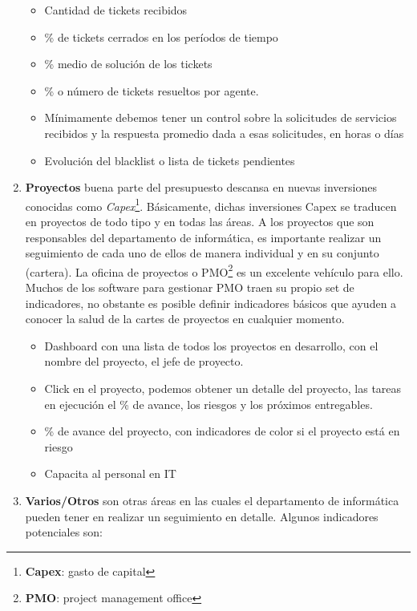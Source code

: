 \documentclass[12pt]{article}
\begin{document}
\begin{enumerate}
  \begin{itemize}
    \item Cantidad de tickets recibidos
    \item \% de tickets cerrados en los períodos de tiempo
    \item \% medio de solución de los tickets
    \item \% o número de tickets resueltos por agente.
    \item Mínimamente debemos tener un control sobre la solicitudes de servicios recibidos y la respuesta promedio dada a esas solicitudes, en horas o días
    \item Evolución del blacklist o lista de tickets pendientes
  \end{itemize}

  \item \textbf{Proyectos} buena parte del presupuesto descansa en nuevas inversiones conocidas como \textit{Capex}\footnote{\textbf{Capex}: gasto de capital}. Básicamente, dichas inversiones Capex se traducen en proyectos de todo tipo y en todas las áreas. A los proyectos que son responsables del departamento de informática, es importante realizar un seguimiento de cada uno de ellos de manera individual y en su conjunto (cartera). La oficina de proyectos o PMO\footnote{\textbf{PMO}: project management office} es un excelente vehículo para ello. Muchos de los software para gestionar PMO traen su propio set de indicadores, no obstante es posible definir indicadores básicos que ayuden a conocer la salud de la cartes de proyectos en cualquier momento.

  \begin{itemize}
    \item Dashboard con una lista de todos los proyectos en desarrollo, con el nombre del proyecto,
    el jefe de proyecto.
    \item Click en el proyecto, podemos obtener un detalle del proyecto, las tareas en ejecución el \% de avance, los riesgos y los próximos entregables.
    \item \% de avance del proyecto, con indicadores de color si el proyecto está en riesgo
    \item Capacita al personal en IT
  \end{itemize}

  \item \textbf{Varios/Otros} son otras áreas en las cuales el departamento de informática pueden tener en realizar un seguimiento en detalle. Algunos indicadores potenciales son:


\end{enumerate}
\end{document}
